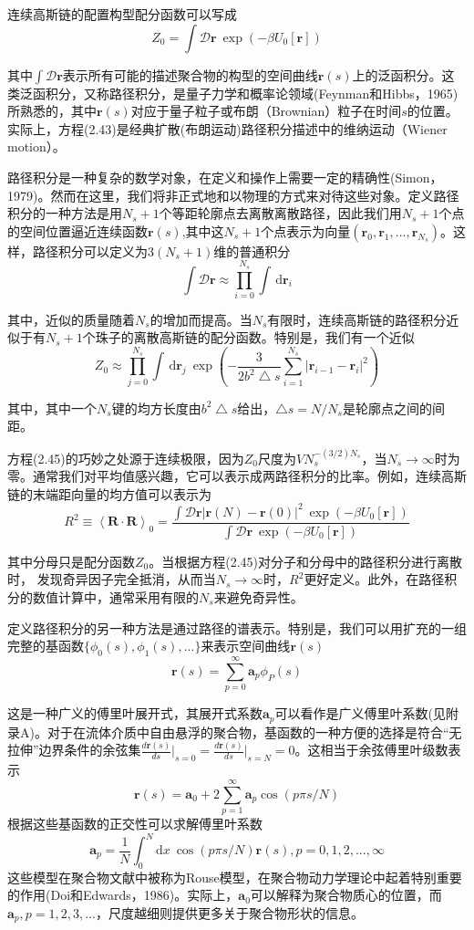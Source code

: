 \documentclass[12pt,a4paper]{article}
\begin{document}
连续高斯链的配置构型配分函数可以写成
$$Z_0=\int \mathcal{D}\mathbf{r}~\exp(-\beta U_0[\mathbf{r}])$$

其中$\int \mathcal{D}\mathbf{r}$表示所有可能的描述聚合物的构型的空间曲线$\mathbf{r}(s)$上的泛函积分。这类泛函积分，又称路径积分，是量子力学和概率论领域(Feynman和Hibbs，1965)所熟悉的，其中$\mathbf{r}(s)$对应于量子粒子或布朗（Brownian）粒子在时间$s$的位置。实际上，方程(2.43)是经典扩散(布朗运动)路径积分描述中的维纳运动（Wiener motion）。

路径积分是一种复杂的数学对象，在定义和操作上需要一定的精确性(Simon，1979)。然而在这里，我们将非正式地和以物理的方式来对待这些对象。定义路径积分的一种方法是用$N_s+1$个等距轮廓点去离散离散路径，因此我们用$N_s+1$个点的空间位置逼近连续函数$\mathbf{r}(s)$,其中这$N_s+1$个点表示为向量$(\mathbf{r}_0,\mathbf{r}_1,...,\mathbf{r}_{N_s})$。这样，路径积分可以定义为$3(N_s+1)$维的普通积分
$$\int \mathcal{D}\mathbf{r}\approx \prod_{i=0}^{N_s} \int \, \mathrm{d} \mathbf{r}_i$$

其中，近似的质量随着$N_s$的增加而提高。当$N_s$有限时，连续高斯链的路径积分近似于有$N_s+1$个珠子的离散高斯链的配分函数。特别是，我们有一个近似
$$Z_0\approx \prod_{j=0}^{N_s} \int \, \mathrm{d} \mathbf{r}_j~\exp \left( -\frac{3}{2b^2\bigtriangleup s}\sum_{i=1}^{N_s}\left|\mathbf{r}_{i-1}-\mathbf{r}_i \right|^2 \right)$$

其中，其中一个$N_s$键的均方长度由$b^2\bigtriangleup s$给出，$\bigtriangleup s=N/N_s$是轮廓点之间的间距。

方程(2.45)的巧妙之处源于连续极限，因为$Z_0$尺度为$VN_s^{−(3/2)N_s}$，当$N_s\rightarrow \infty$时为零。通常我们对平均值感兴趣，它可以表示成两路径积分的比率。例如，连续高斯链的末端距向量的均方值可以表示为
$$R^2\equiv \left \langle \mathbf{R}\cdot \mathbf{R}\right \rangle _0=\frac{\int \mathcal{D}\mathbf{r}\left| \mathbf{r}(N)-\mathbf{r}(0) \right|^2~\exp(-\beta U_0[\mathbf{r}])}{\int \mathcal{D}\mathbf{r}~\exp(-\beta U_0[\mathbf{r}])}$$

其中分母只是配分函数$Z_0$。当根据方程(2.45)对分子和分母中的路径积分进行离散时，
发现奇异因子完全抵消，从而当$N_s\rightarrow \infty$时，$R^2$更好定义。此外，在路径积分的数值计算中，通常采用有限的$N_s$来避免奇异性。

定义路径积分的另一种方法是通过路径的谱表示。特别是，我们可以用扩充的一组完整的基函数$\lbrace \phi _0(s),\phi _1(s),... \rbrace$来表示空间曲线$\mathbf{r}(s)$
$$\mathbf{r}(s)=\sum_{p=0}^{\infty} \mathbf{a}_p \phi _P(s)$$

这是一种广义的傅里叶展开式，其展开式系数$\mathbf{a}_p$可以看作是广义傅里叶系数(见附录A)。对于在流体介质中自由悬浮的聚合物，基函数的一种方便的选择是符合“无拉伸”边界条件的余弦集$\frac{d\mathbf{r}(s)}{ds}\vert _{s=0}=\frac{d\mathbf{r}(s)}{ds}\vert _{s=N}=0$。这相当于余弦傅里叶级数表示
$$\mathbf{r}(s)=\mathbf{a}_0+2\sum_{p=1}^{\infty} \mathbf{a}_p \cos(p\pi s/N)$$
根据这些基函数的正交性可以求解傅里叶系数
$$\mathbf{a}_p=\frac{1}{N}\int_{0}^{N}  \mathrm{d}x~\cos(p\pi s/N)\mathbf{r}(s),p=0,1,2,...,\infty$$
这些模型在聚合物文献中被称为Rouse模型，在聚合物动力学理论中起着特别重要的作用(Doi和Edwards，1986)。实际上，$\mathbf{a}_0$可以解释为聚合物质心的位置，而$\mathbf{a}_p,p=1,2,3,...$，尺度越细则提供更多关于聚合物形状的信息。
\end{document}
